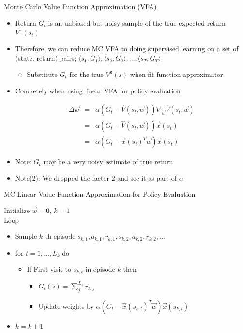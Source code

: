 \begin{frame}[c]{Monte Carlo Value Function Approximation (VFA)}
	
	
	\begin{itemize}
		\item Return $G_t$ is an unbiased but noisy sample of the true expected return $V^\pi(s_t)$
		\item Therefore, we can reduce MC VFA to doing supervised learning on a set of (state, return) pairs; $\langle s_1, G_1 \rangle, \langle s_2, G_2 \rangle,\ldots, \langle s_T, G_T \rangle$
		\begin{itemize}
			\item Substitute $G_t$ for the true $V^\pi(s)$ when fit function approximator
		\end{itemize}
		\item Concretely when using linear VFA for policy evaluation
		
		\begin{eqnarray}
		 \Delta \vec{w} &=& \alpha (G_t - \hat{V} (s_t, \vec{w})) \nabla_\vec{w}\hat{V}(s_t; \vec{w}) \nonumber\\
		 &=& \alpha (G_t - \hat{V} (s_t, \vec{w})) \vec{x}(s_t) \nonumber\\
		 &=& \alpha (G_t - \vec{x}(s_t)^T \vec{w}) \vec{x}(s_t) \nonumber
		\end{eqnarray}
		
		\item Note: $G_t$ may be a very noisy estimate of true return
		\item Note(2): We dropped the factor $2$ and see it as part of $\alpha$
		
	\end{itemize}
	
\end{frame}
\begin{frame}[c]{MC Linear Value Function Approximation for Policy
		Evaluation}
	

Initialize $\vec{w}= \mathbf{0}$, $k=1$\\
Loop	
	\begin{itemize}
		\item Sample $k$-th episode $s_{k,1}, a_{k,1}, r_{k,1}, s_{k,2}, a_{k,2}, r_{k,2}, \ldots$
		\item for $t=1, \ldots, L_k$ do
		\begin{itemize}
			\item If First visit to $s_{k,t}$ in episode $k$ then
			\begin{itemize}
					\item $G_t(s) = \sum_{j}^{L_k} r_{k,j}$
					\item Update weights by $\alpha (G_t - \vec{x}(s_{k,t})^T \vec{w}) \vec{x}(s_{k,t})$
			\end{itemize}
		\end{itemize}
	\item $k = k + 1$
	\end{itemize}
	
\end{frame}
